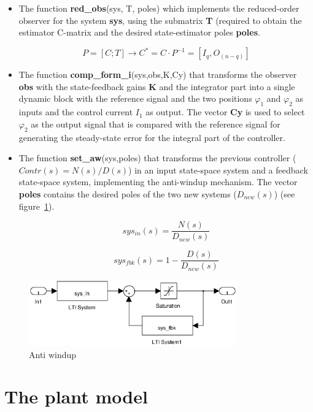 \begin{itemize}
\item The function \textbf{red\_obs}(sys, T, poles) which implements the 
reduced-order observer for the system \textbf{sys}, using the submatrix 
\textbf{T} (required to obtain the estimator C-matrix 
and the desired state-estimator poles \textbf{poles}.

$$
P = [C;T] \to C^*=C \cdot P^{-1}=[I_q,O_{(n-q)}]
$$

\item The function \textbf{comp\_form\_i}(sys,obs,K,Cy) that transforms the 
observer \textbf{obs} with the state-feedback gains \textbf{K} and the 
integrator part into a single dynamic block with the reference signal and the 
two positions $\varphi_1$ and $\varphi_2$ as inputs and the control current 
$I_1$ as output. The vector \textbf{Cy} is used to select $\varphi_2$ as the 
output signal that is compared with the reference signal for generating the 
steady-state error for the integral part of the controller.

\item The function \textbf{set\_aw}(sys,poles) that transforms the previous 
controller ($Contr(s)=N(s)/D(s)$) in an input state-space system and a feedback 
state-space system, implementing the anti-windup mechanism. The vector 
\textbf{poles} contains the desired poles of the two new systems ($D_{new}(s)$) 
(see figure~\ref{F20a}).

$$
sys_{in}(s) = \frac{N(s)}{D_{new}(s)} 
$$

$$
sys_{fbk}(s) = 1-\frac{D(s)}{D_{new}(s)}
$$

\end{itemize}

\begin{figure}[htbp]	%
\centering
\includegraphics[width=0.8\textwidth]{eps/aw.eps}
\caption{Anti windup}
\label{F20a}
\end{figure}

\section{The plant model}

